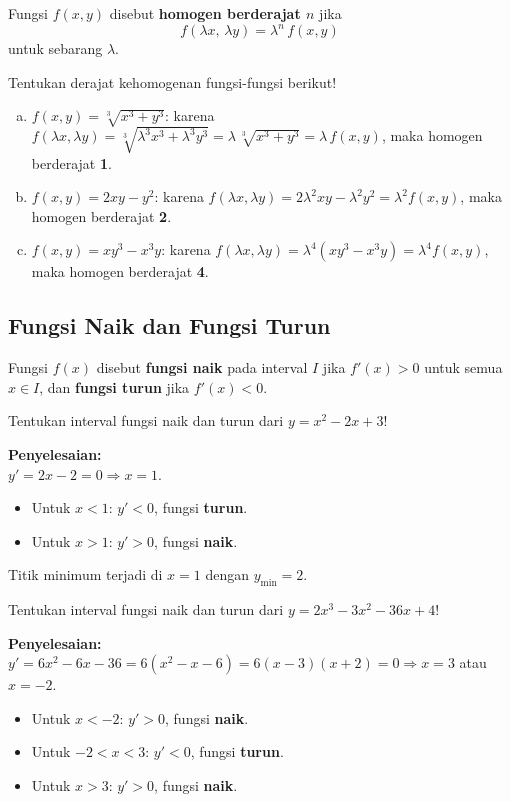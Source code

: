 Fungsi $f(x,y)$ disebut \textbf{homogen berderajat $n$} jika
\[
f(\lambda x,\, \lambda y) = \lambda^n\, f(x,y)
\]
untuk sebarang $\lambda$.

\begin{exmp}
Tentukan derajat kehomogenan fungsi-fungsi berikut!
\begin{enumerate}[(a)]
\item $f(x,y) = \sqrt[3]{x^3 + y^3}$: karena $f(\lambda x, \lambda y) = \sqrt[3]{\lambda^3 x^3 + \lambda^3 y^3} = \lambda\,\sqrt[3]{x^3+y^3} = \lambda\,f(x,y)$, maka homogen berderajat \textbf{1}.
\item $f(x,y) = 2xy - y^2$: karena $f(\lambda x, \lambda y) = 2\lambda^2 xy - \lambda^2 y^2 = \lambda^2 f(x,y)$, maka homogen berderajat \textbf{2}.
\item $f(x,y) = xy^3 - x^3 y$: karena $f(\lambda x, \lambda y) = \lambda^4(xy^3 - x^3 y) = \lambda^4 f(x,y)$, maka homogen berderajat \textbf{4}.
\end{enumerate}
\end{exmp}

\subsection{Fungsi Naik dan Fungsi Turun}

Fungsi $f(x)$ disebut \textbf{fungsi naik} pada interval $I$ jika $f'(x) > 0$ untuk semua $x \in I$, dan \textbf{fungsi turun} jika $f'(x) < 0$.

\begin{exmp}
Tentukan interval fungsi naik dan turun dari $y = x^2 - 2x + 3$!

\textbf{Penyelesaian:}\\
$y' = 2x - 2 = 0 \Rightarrow x = 1$.
\begin{itemize}
\item Untuk $x < 1$: $y' < 0$, fungsi \textbf{turun}.
\item Untuk $x > 1$: $y' > 0$, fungsi \textbf{naik}.
\end{itemize}
Titik minimum terjadi di $x = 1$ dengan $y_{\min} = 2$.
\end{exmp}

\begin{exmp}
Tentukan interval fungsi naik dan turun dari $y = 2x^3 - 3x^2 - 36x + 4$!

\textbf{Penyelesaian:}\\
$y' = 6x^2 - 6x - 36 = 6(x^2 - x - 6) = 6(x-3)(x+2) = 0 \Rightarrow x = 3$ atau $x = -2$.
\begin{itemize}
\item Untuk $x < -2$: $y' > 0$, fungsi \textbf{naik}.
\item Untuk $-2 < x < 3$: $y' < 0$, fungsi \textbf{turun}.
\item Untuk $x > 3$: $y' > 0$, fungsi \textbf{naik}.
\end{itemize}
\end{exmp}

